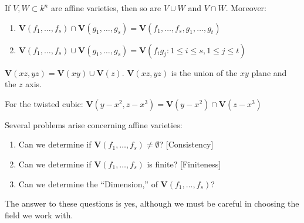 \documentclass[crop=false,class=book,oneside]{standalone}
\begin{document}
                \begin{theorem}
                    If $V,W\subset k^n$ are affine varieties,
                    then so are $V\cup W$ and $V\cap W$. Moreover:
                    \begin{enumerate}
                        \item $\mathbf{V}(f_{1},\hdots,f_{s})%
                               \cap\mathbf{V}(g_{1},\hdots,g_{s})%
                               =\mathbf{V}(f_{1},%
                               \hdots,f_{s},g_{1},%
                               \hdots,g_{t})$
                        \item $\mathbf{V}(f_{1},\hdots,f_{s})%
                               \cup\mathbf{V}(g_{1},\hdots,g_{s})%
                               =\mathbf{V}(%
                               f_{i}g_{j}:1\leq i\leq s,1\leq j\leq t)$
                    \end{enumerate}
                \end{theorem}
                \begin{example}
                    $\mathbf{V}(xz,yz)%
                     =\mathbf{V}(xy)\cup\mathbf{V}(z)$.
                    $\mathbf{V}(xz,yz)$ is the union
                    of the $xy$ plane
                    and the $z$ axis.
                \end{example}
                \begin{example}
                    For the twisted cubic:
                    $\mathbf{V}(y-x^{2},z-x^{3})%
                     =\mathbf{V}(y-x^{2})\cap\mathbf{V}(z-x^{3})$
                \end{example}
                Several problems arise concerning affine varieties:
                \begin{enumerate}
                    \item Can we determine if
                          $\mathbf{V}(f_{1},\hdots,f_{s})\ne\emptyset$?
                          \hfill[Consistency]
                    \item Can we determine if
                          $\mathbf{V}(f_{1},\hdots,f_{s})$ is finite?
                          \hfill[Finiteness]
                    \item Can we determine the ``Dimension,'' of
                          $\mathbf{V}(f_{1},\hdots,f_{s})$?
                \end{enumerate}
                The answer to these questions is yes,
                although we must be careful in choosing
                the field we work with. 
\end{document}

